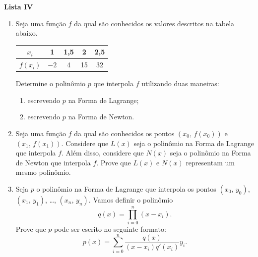 \documentclass[12pt,a4paper]{article}
\begin{document}
\begin{center}
  \textbf{Lista IV}
\end{center}

\begin{enumerate}
  
  \item Seja uma função $f$ da qual são conhecidos os valores descritos na
  tabela abaixo.
  \begin{center}
    \begin{tabular}{c|c|c|c|c}
      $x_i$ & 1 & 1,5 & 2 & 2,5\\ \hline
      $f(x_i)$ & $-2$ & 4 & 15 & 32
    \end{tabular}
  \end{center}

  Determine o polinômio $p$ que interpola $f$ utilizando duas maneiras:
  \begin{enumerate}
   \item escrevendo $p$ na Forma de Lagrange;
   \item escrevendo $p$ na Forma de Newton.
  \end{enumerate}

  \item Seja uma função $f$ da qual são conhecidos os pontos $(x_0,\,f(x_0))$ e 
  $(x_1,\,f(x_1))$. Considere que $L(x)$ seja o polinômio na Forma de Lagrange que
  interpola $f$. Além disso, considere que $N(x)$ seja o polinômio na Forma de Newton que
  interpola $f$. Prove que $L(x)$ e $N(x)$ representam um mesmo polinômio.

  \item Seja $p$ o polinômio na Forma de Lagrange que interpola os pontos
  $(x_0,\,y_0)$, $(x_1,\,y_1)$, \ldots, $(x_n,\,y_n)$. Vamos definir o polinômio
  $$q(x) = \prod_{i=0}^{n} (x-x_i).$$ Prove que $p$ pode ser escrito no seguinte
  formato: 
  $$p(x) = \sum_{i=0}^n\frac{q(x)}{(x-x_i)q'(x_i)}y_i.$$

\end{enumerate}
\end{document}
